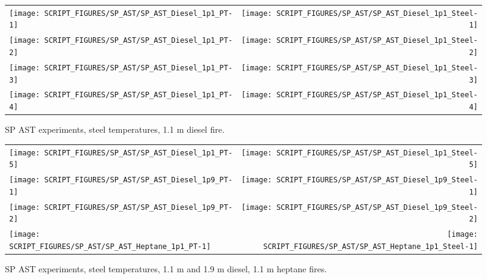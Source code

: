 \newpage

\begin{figure}[p]
\begin{tabular*}{\textwidth}{l@{\extracolsep{\fill}}r}
\texttt{[image: SCRIPT\_FIGURES/SP\_AST/SP\_AST\_Diesel\_1p1\_PT-1]}  &  \texttt{[image: SCRIPT\_FIGURES/SP\_AST/SP\_AST\_Diesel\_1p1\_Steel-1]}    \\
\texttt{[image: SCRIPT\_FIGURES/SP\_AST/SP\_AST\_Diesel\_1p1\_PT-2]}  &  \texttt{[image: SCRIPT\_FIGURES/SP\_AST/SP\_AST\_Diesel\_1p1\_Steel-2]}    \\
\texttt{[image: SCRIPT\_FIGURES/SP\_AST/SP\_AST\_Diesel\_1p1\_PT-3]}  &  \texttt{[image: SCRIPT\_FIGURES/SP\_AST/SP\_AST\_Diesel\_1p1\_Steel-3]}    \\
\texttt{[image: SCRIPT\_FIGURES/SP\_AST/SP\_AST\_Diesel\_1p1\_PT-4]}  &  \texttt{[image: SCRIPT\_FIGURES/SP\_AST/SP\_AST\_Diesel\_1p1\_Steel-4]}
\end{tabular*}
\caption{SP AST experiments, steel temperatures, 1.1 m diesel fire.}
\label{SP_Diesel_1p1_PT_Steel}
\end{figure}

\begin{figure}[p]
\begin{tabular*}{\textwidth}{l@{\extracolsep{\fill}}r}
\texttt{[image: SCRIPT\_FIGURES/SP\_AST/SP\_AST\_Diesel\_1p1\_PT-5]}  &  \texttt{[image: SCRIPT\_FIGURES/SP\_AST/SP\_AST\_Diesel\_1p1\_Steel-5]}   \\
\texttt{[image: SCRIPT\_FIGURES/SP\_AST/SP\_AST\_Diesel\_1p9\_PT-1]}  &  \texttt{[image: SCRIPT\_FIGURES/SP\_AST/SP\_AST\_Diesel\_1p9\_Steel-1]}   \\
\texttt{[image: SCRIPT\_FIGURES/SP\_AST/SP\_AST\_Diesel\_1p9\_PT-2]}  &  \texttt{[image: SCRIPT\_FIGURES/SP\_AST/SP\_AST\_Diesel\_1p9\_Steel-2]}   \\
\texttt{[image: SCRIPT\_FIGURES/SP\_AST/SP\_AST\_Heptane\_1p1\_PT-1]} &  \texttt{[image: SCRIPT\_FIGURES/SP\_AST/SP\_AST\_Heptane\_1p1\_Steel-1]}
\end{tabular*}
\caption{SP AST experiments, steel temperatures, 1.1 m and 1.9 m diesel, 1.1 m heptane fires.}
\label{SP_Diesel_1p9_PT_Steel}
\end{figure}

